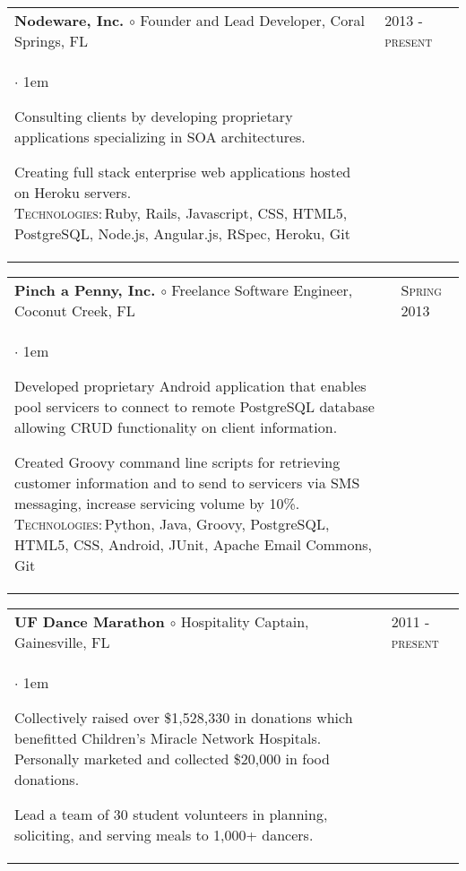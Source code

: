 \documentclass[11pt]{article}
\makeatletter
\newcommand{\employer}[4]
	{{ \begin{tabular}{l@{\hspace{5mm}}|p{30mm}}
	   \multicolumn{1}{l}{\textbf{#1 $\circ$ }#2}&\multicolumn{1}{p{30mm}}{\hspace{-3mm}\textsc{#3}} \\
	   \parbox{.825\textwidth}{#4 \vspace*{-4pt}}
	   \end{tabular} \vspace{4pt} }}
\newenvironment{achievements}           %
	{\begin{list}{$\cdot$}{\topsep 0pt \itemsep 4pt \parsep 0pt \leftmargin 1em}
	 \linespread{1.05} \selectfont %
	}
	{\end{list}\vspace*{4pt}}
\def\kt{\vspace*{2pt}\\\textsc{Technologies:\,}}
\makeatother
\begin{document}
\employer{Nodeware, Inc.}{Founder and Lead Developer, Coral Springs, FL}{2013 - present}{
\begin{achievements}

\item{Consulting clients by developing proprietary applications specializing in SOA architectures.}

\item{Creating full stack enterprise web applications hosted on Heroku servers. \kt Ruby, Rails, Javascript, CSS, HTML5, PostgreSQL, Node.js, Angular.js, RSpec, Heroku, Git}

\end{achievements} 
}


\employer{Pinch a Penny, Inc.}{Freelance Software Engineer, Coconut Creek, FL}{Spring 2013}{
	\begin{achievements}
	
	\item{Developed proprietary Android application that enables pool servicers to connect to remote PostgreSQL database allowing CRUD functionality on client information.}
	
	\item{Created Groovy command line scripts for retrieving customer information and to send to servicers via SMS messaging, increase servicing volume by 10\%.  \kt Python, Java, Groovy, PostgreSQL, HTML5, CSS, Android, JUnit, Apache Email Commons, Git}
	
	\end{achievements}
}

\employer{UF Dance Marathon}{Hospitality Captain, Gainesville, FL}{2011 - present} {
	\begin{achievements}
	
	\item{Collectively raised over \$1,528,330 in donations which benefitted Children’s Miracle Network Hospitals. Personally marketed and collected \$20,000 in food donations.}
	\item{Lead a team of 30 student volunteers in planning, soliciting, and serving meals to 1,000+ dancers. }

	\end{achievements}
}
\end{document}
